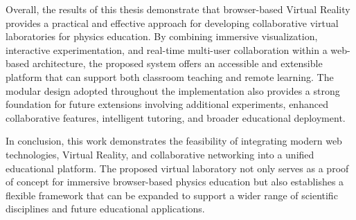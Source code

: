 Overall, the results of this thesis demonstrate that browser-based Virtual Reality provides a practical and effective approach for developing collaborative virtual laboratories for physics education. By combining immersive visualization, interactive experimentation, and real-time multi-user collaboration within a web-based architecture, the proposed system offers an accessible and extensible platform that can support both classroom teaching and remote learning. The modular design adopted throughout the implementation also provides a strong foundation for future extensions involving additional experiments, enhanced collaborative features, intelligent tutoring, and broader educational deployment.

In conclusion, this work demonstrates the feasibility of integrating modern web technologies, Virtual Reality, and collaborative networking into a unified educational platform. The proposed virtual laboratory not only serves as a proof of concept for immersive browser-based physics education but also establishes a flexible framework that can be expanded to support a wider range of scientific disciplines and future educational applications.